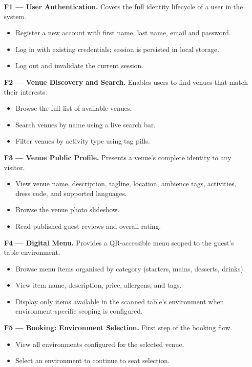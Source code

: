 \documentclass[12pt,a4paper]{article}
\begin{document}
\textbf{F1 --- User Authentication.}
Covers the full identity lifecycle of a user in the system.
\begin{itemize}[leftmargin=1.5em, topsep=2pt, itemsep=1pt]
    \item Register a new account with first name, last name, email and password.
    \item Log in with existing credentials; session is persisted in local storage.
    \item Log out and invalidate the current session.
\end{itemize}

\textbf{F2 --- Venue Discovery and Search.}
Enables users to find venues that match their interests.
\begin{itemize}[leftmargin=1.5em, topsep=2pt, itemsep=1pt]
    \item Browse the full list of available venues.
    \item Search venues by name using a live search bar.
    \item Filter venues by activity type using tag pills.
\end{itemize}

\textbf{F3 --- Venue Public Profile.}
Presents a venue's complete identity to any visitor.
\begin{itemize}[leftmargin=1.5em, topsep=2pt, itemsep=1pt]
    \item View venue name, description, tagline, location, ambience tags,
          activities, dress code, and supported languages.
    \item Browse the venue photo slideshow.
    \item Read published guest reviews and overall rating.
\end{itemize}

\textbf{F4 --- Digital Menu.}
Provides a QR-accessible menu scoped to the guest's table environment.
\begin{itemize}[leftmargin=1.5em, topsep=2pt, itemsep=1pt]
    \item Browse menu items organised by category (starters, mains, desserts,
          drinks).
    \item View item name, description, price, allergens, and tags.
    \item Display only items available in the scanned table's environment
          when environment-specific scoping is configured.
\end{itemize}

\textbf{F5 --- Booking: Environment Selection.}
First step of the booking flow.
\begin{itemize}[leftmargin=1.5em, topsep=2pt, itemsep=1pt]
    \item View all environments configured for the selected venue.
    \item Select an environment to continue to seat selection.
\end{itemize}
\end{document}
